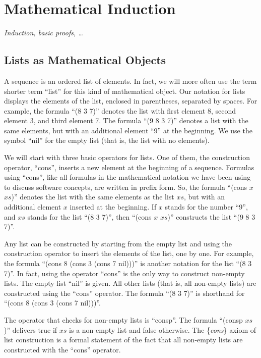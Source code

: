 \chapter{Mathematical Induction}

\textit{Induction, basic proofs, \dots}

\section{Lists as Mathematical Objects}
\label{sec:lists-as-obj}
A sequence is an ordered list of elements. In fact, we will more often use the term shorter term ``list'' for this kind of mathematical object. Our notation for lists displays the elements of the list, enclosed in parentheses, separated by spaces. For example, the formula ``(8 3 7)'' denotes the list with first element 8, second element 3, and third element 7. The formula ``(9 8 3 7)'' denotes a list with the same elements, but with an additional element ``9'' at the beginning. We use the symbol ``nil'' for the empty list (that is, the list with no elements).

We will start with three basic operators for lists. One of them, the construction operator, ``cons'', inserts a new element at the beginning of a sequence. Formulas using ``cons'', like all formulas in the mathematical notation we have been using to discuss software concepts, are written in prefix form. So, the formula ``(cons $x$ $xs$)'' denotes the list with the same elements as the list $xs$, but with an additional element $x$ inserted at the beginning. If $x$ stands for the number ``9'', and $xs$ stands for the list ``(8 3 7)'', then ``(cons $x$ $xs$)'' constructs the list ``(9 8 3 7)''.

Any list can be constructed by starting from the empty list and using the construction operator to insert the elements of the list, one by one. For example, the formula ``(cons 8 (cons 3 (cons 7 nil)))'' is another notation for the list ``(8 3 7)''. In fact, using the operator ``cons'' is the only way to construct non-empty lists. The empty list ``nil'' is given. All other lists (that is, all non-empty lists) are constructed using the ``cons'' operator. The formula ``(8 3 7)'' is shorthand for ``(cons 8 (cons 3 (cons 7 nil)))''.

The operator that checks for non-empty lists is ``consp''. The formula ``(consp $xs$)'' delivers true if $xs$ is a non-empty list and false otherwise. The \{\emph{cons}\} axiom of list construction is a formal statement of the fact that all non-empty lists are constructed with the ``cons'' operator.

